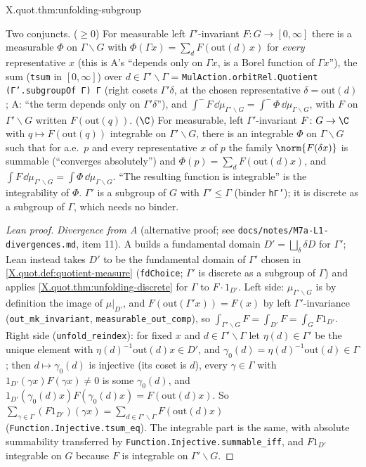 \begin{tfformal}{X.quot.thm:unfolding-subgroup}
\begin{tffidelity}
Two conjuncts. ($\ge0$) For measurable left $\Gamma'$-invariant $F\colon G\to[0,\infty]$ there is a measurable $\Phi$ on $\Gamma\backslash G$ with $\Phi(\Gamma x)=\sum_{d}F(\mathrm{out}(d)\,x)$ for \emph{every} representative $x$ (this is A's ``depends only on $\Gamma x$, is a Borel function of $\Gamma x$''), the sum (\texttt{tsum} in $[0,\infty]$) over $d\in\Gamma'\backslash\Gamma$ = \texttt{MulAction.orbitRel.Quotient (Γ'.subgroupOf Γ) Γ} (right cosets $\Gamma'\delta$, at the chosen representative $\delta=\mathrm{out}(d)$; A: ``the term depends only on $\Gamma'\delta$''), and $\int^-F\,\dd\mu_{\Gamma'\backslash G}=\int^-\Phi\,\dd\mu_{\Gamma\backslash G}$, with $F$ on $\Gamma'\backslash G$ written $F(\mathrm{out}(q))$. ($\C$) For measurable, left $\Gamma'$-invariant $F\colon G\to\C$ with $q\mapsto F(\mathrm{out}(q))$ integrable on $\Gamma'\backslash G$, there is an integrable $\Phi$ on $\Gamma\backslash G$ such that for a.e.\ $p$ and every representative $x$ of $p$ the family $\norm{F(\delta x)}$ is summable (``converges absolutely'') and $\Phi(p)=\sum_dF(\mathrm{out}(d)x)$, and $\int F\,\dd\mu_{\Gamma'\backslash G}=\int\Phi\,\dd\mu_{\Gamma\backslash G}$. ``The resulting function is integrable'' is the integrability of $\Phi$. $\Gamma'$ is a subgroup of $G$ with $\Gamma'\le\Gamma$ (binder \texttt{hΓ'}); it is discrete as a subgroup of $\Gamma$, which needs no binder.
\end{tffidelity}
\end{tfformal}
\begin{proof}[Lean proof]
\emph{Divergence from A} (alternative proof; see \texttt{docs/notes/M7a-L1-divergences.md}, item 11). A builds a fundamental domain $D'=\bigsqcup_{\delta}\delta D$ for $\Gamma'$; Lean instead takes $D'$ to be the fundamental domain of $\Gamma'$ chosen in \cref{X.quot.def:quotient-measure} (\texttt{fdChoice}; $\Gamma'$ is discrete as a subgroup of $\Gamma$) and applies \cref{X.quot.thm:unfolding-discrete} for $\Gamma$ to $F\cdot1_{D'}$. Left side: $\mu_{\Gamma'\backslash G}$ is by definition the image of $\mu|_{D'}$, and $F(\mathrm{out}(\Gamma'x))=F(x)$ by left $\Gamma'$-invariance (\texttt{out\_mk\_invariant}, \texttt{measurable\_out\_comp}), so $\int_{\Gamma'\backslash G}F=\int_{D'}F=\int_G F1_{D'}$. Right side (\texttt{unfold\_reindex}): for fixed $x$ and $d\in\Gamma'\backslash\Gamma$ let $\eta(d)\in\Gamma'$ be the unique element with $\eta(d)^{-1}\mathrm{out}(d)x\in D'$, and $\gamma_0(d)=\eta(d)^{-1}\mathrm{out}(d)\in\Gamma$; then $d\mapsto\gamma_0(d)$ is injective (its coset is $d$), every $\gamma\in\Gamma$ with $1_{D'}(\gamma x)F(\gamma x)\ne0$ is some $\gamma_0(d)$, and $1_{D'}(\gamma_0(d)x)F(\gamma_0(d)x)=F(\mathrm{out}(d)x)$. So $\sum_{\gamma\in\Gamma}(F1_{D'})(\gamma x)=\sum_{d\in\Gamma'\backslash\Gamma}F(\mathrm{out}(d)x)$ (\texttt{Function.Injective.tsum\_eq}). The integrable part is the same, with absolute summability transferred by \texttt{Function.Injective.summable\_iff}, and $F1_{D'}$ integrable on $G$ because $F$ is integrable on $\Gamma'\backslash G$.
\end{proof}

